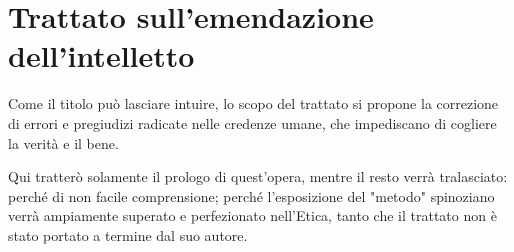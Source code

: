 \chapter{Trattato sull'emendazione dell'intelletto}

\bigskip
\bigskip
\bigskip

Come il titolo può lasciare intuire, lo scopo del trattato si propone la correzione di errori e pregiudizi radicate nelle credenze umane, che impediscano di cogliere la verità e il bene.

Qui tratterò solamente il prologo di quest'opera, mentre il resto verrà tralasciato: perché di non facile comprensione; perché l'esposizione del "metodo" spinoziano verrà ampiamente superato  e perfezionato nell'Etica, tanto che il trattato non è stato portato a termine dal suo autore.


\newpage
